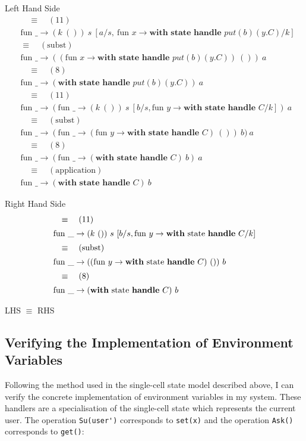 \documentclass[logo,bsc,singlespacing,parskip]{infthesis}
\begin{document}
{Left Hand Side}
\vspace{-0.5em}
\begin{align*}
&\quad\equiv\quad (11) \\
&\text{fun } \_ \rightarrow (k\ ())\ s\ [a/s,\ \text{fun } x \rightarrow \textbf{with state handle } put(b)(y.C)/k] \\
&\equiv\quad (\text{subst}) \\
&\text{fun } \_ \rightarrow ((\text{fun } x \rightarrow \textbf{with state handle } put(b)(y.C))\ ())\ a \\
&\quad\equiv\quad (8) \\
&\text{fun } \_ \rightarrow (\textbf{with state handle } put(b)(y.C))\ a \\
&\quad\equiv\quad (11) \\
&\text{fun } \_ \rightarrow (\text{fun } \_ \rightarrow (k\ ())\ s\ [b/s, \text{fun } y \rightarrow \textbf{with state handle } C/k])\ a \\
&\quad\equiv\quad (\text{subst}) \\
&\text{fun } \_ \rightarrow (\text{fun } \_ \rightarrow (\text{fun } y \rightarrow \textbf{with state handle } C)\ ())\ b)\ a \\
&\quad\equiv\quad (8) \\
&\text{fun } \_ \rightarrow (\text{fun } \_ \rightarrow (\textbf{with state handle } C)\ b)\ a \\
&\quad\equiv\quad (\text{application}) \\
&\text{fun } \_ \rightarrow (\textbf{with state handle } C)\ b
\end{align*}


{Right Hand Side}
\[ 
\begin{array}{l}
\quad\equiv\quad (11) \\[5pt]
\text{fun }\_ \rightarrow (k\ ())\ s\ [b/s, \text{fun } y \rightarrow \text{\textbf{with} state \textbf{handle} } C/k] \\[5pt]
\quad\equiv\quad (\text{subst}) \\[5pt]
\text{fun }\_ \rightarrow ((\text{fun } y \rightarrow \text{\textbf{with} state \textbf{handle} } C)\ ())\ b \\[5pt]
\quad\equiv\quad (8) \\[5pt]
\text{fun }\_ \rightarrow (\text{\textbf{with} state \textbf{handle} } C)\ b
\end{array}
\]

LHS $\equiv$ RHS



\subsection{Verifying the Implementation of Environment Variables}
Following the method used in the single-cell state model described above, I can verify the concrete implementation of environment variables in my system. These handlers are a specialisation of the single-cell state which represents the current user. The operation \lstinline{Su(user')} corresponds to \lstinline{set(x)} and the operation \lstinline{Ask()} corresponds to \lstinline{get()}:
\end{document}
